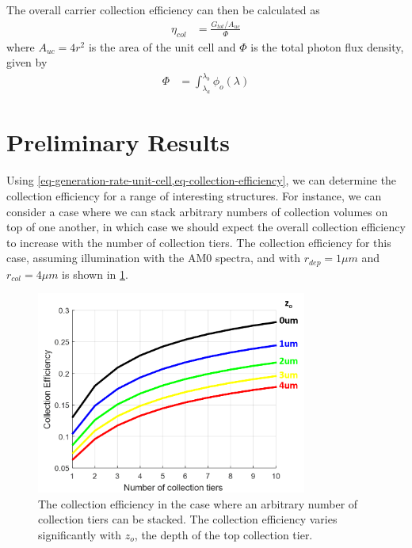 \documentclass[journal,twoside]{IEEEtran}
\begin{document}
The overall carrier collection efficiency can then be calculated as
\begin{align}
	\eta_{col} &= \frac{G_{tot} / A_{uc} }{\Phi}	\label{eq-collection-efficiency}
\end{align}
where $A_{uc} = 4r^2$ is the area of the unit cell and $\Phi$ is the total photon flux density, given by
\begin{align}
	\Phi &= \int_{\lambda_a}^{\lambda_b} \phi_o(\lambda)
\end{align}

\section{Preliminary Results}
Using \cref{eq-generation-rate-unit-cell,eq-collection-efficiency}, we can determine the collection efficiency
for a range of interesting structures. For instance, we can consider a case where we can stack arbitrary numbers
of collection volumes on top of one another, in which case we should expect the overall collection efficiency
to increase with the number of collection tiers. The collection efficiency for this case, assuming illumination with the AM0
spectra, and with $r_{dep}=1\mu m$ and $r_{col} = 4\mu m$ is shown in
\cref{f-collection-efficiency-arbitrary-tiers}.

\begin{figure}[tb]
	\centering
	\includegraphics[width=3.5in]{figures/eta_col_fcc_stack_arbitrary_tiers.png}
	\caption{	The collection efficiency in the case where an arbitrary number of collection tiers can be stacked.
				The collection efficiency varies significantly with $z_o$, the depth of the top collection tier.
			}
	\label{f-collection-efficiency-arbitrary-tiers}
\end{figure}
\end{document}
